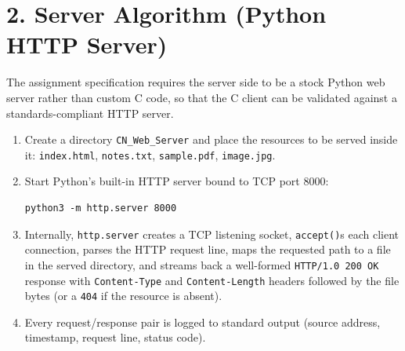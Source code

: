\documentclass[11pt]{article}
\begin{document}
\section*{2. Server Algorithm (Python HTTP Server)}
The assignment specification requires the server side to be a stock Python web server rather
than custom C code, so that the C client can be validated against a standards-compliant HTTP
server.
\begin{enumerate}
  \item Create a directory \texttt{CN\_Web\_Server} and place the resources to be served inside
        it: \texttt{index.html}, \texttt{notes.txt}, \texttt{sample.pdf}, \texttt{image.jpg}.
  \item Start Python's built-in HTTP server bound to TCP port 8000:
  \begin{lstlisting}[style=bashstyle]
python3 -m http.server 8000
  \end{lstlisting}
  \item Internally, \texttt{http.server} creates a TCP listening socket, \texttt{accept()}s each
        client connection, parses the HTTP request line, maps the requested path to a file in the
        served directory, and streams back a well-formed \texttt{HTTP/1.0 200 OK} response with
        \texttt{Content-Type} and \texttt{Content-Length} headers followed by the file bytes (or a
        \texttt{404} if the resource is absent).
  \item Every request/response pair is logged to standard output (source address, timestamp,
        request line, status code).
\end{enumerate}
\end{document}
